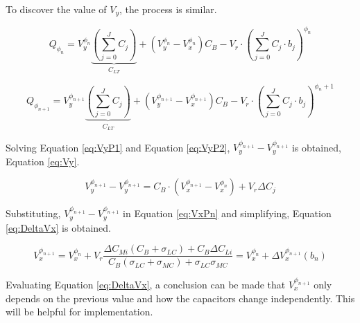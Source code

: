 To discover the value of $V_y$, the process is similar. 

\begin{equation}
    Q_{\phi_{n}} = V_y^{\phi_n}\underbrace{\left( \sum_{j=0}^{J}C_j \right)}_{C_{LT}} + (V_y^{\phi_{n}}-V_x^{\phi_{n}})C_B-V_r\cdot \left ( \sum_{j=0}^{J} C_j\cdot b_j \right )^{\phi_n}
    \label{eq:VyP1}
\end{equation}

\begin{equation}
    Q_{\phi_{n+1}} = V_y^{\phi_{n+1}}\underbrace{\left( \sum_{j=0}^{J}C_j \right)}_{C_{LT}} + (V_y^{\phi_{n+1}}-V_x^{\phi_{n+1}})C_B-V_r\cdot \left ( \sum_{j=0}^{J} C_j\cdot b_j \right )^{\phi_n+1}
    \label{eq:VyP2}
\end{equation}

Solving Equation \ref{eq:VyP1} and Equation \ref{eq:VyP2}, $V_y^{\phi_{n+1}}-V_y^{\phi_{n+1}}$ is obtained, Equation \ref{eq:Vy}.

\begin{equation}
    V_y^{\phi_{n+1}}-V_y^{\phi_{n+1}} = C_B\cdot (V_x^{\phi_{n+1}}-V_x^{\phi_n}) + V_r\Delta C_j
    \label{eq:Vy}
\end{equation}

Substituting, $V_y^{\phi_{n+1}}-V_y^{\phi_{n+1}}$ in Equation \ref{eq:VxPn} and simplifying, Equation \ref{eq:DeltaVx} is obtained.

\begin{equation}
    \boxed{V_{x}^{\phi_{n+1}}=V_{x}^{\phi_n}+V_{r}\frac{   {\Delta}C_{Mi} (C_{B} + \sigma_{LC} )+C_{B} {\Delta}C_{Li}}{C_{B}\left( \sigma_{LC} + \sigma_{MC}\right) + \sigma_{LC} \sigma_{MC}} = V_x^{\phi_n} + \Delta V_x^{\phi_{n+1}} (b_n)}
    \label{eq:DeltaVx}
\end{equation}

Evaluating Equation \ref{eq:DeltaVx}, a conclusion can be made that $V_x^{\phi_{n+1}}$ only depends on the previous value and how the capacitors change independently. This will be helpful for implementation. 

